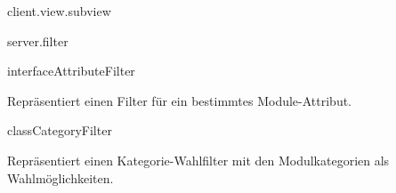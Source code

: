 \begin{texdocpackage}{client.view.subview}
\end{texdocpackage}



\begin{texdocpackage}{server.filter}
\label{texdoclet:edu.kit.informatik.studyplan.server.filter}

\begin{texdocclass}{interface}{AttributeFilter}
\label{texdoclet:edu.kit.informatik.studyplan.server.filter.AttributeFilter}
\begin{texdocclassintro}
Repräsentiert einen Filter für ein bestimmtes Module-Attribut.\end{texdocclassintro}
\begin{texdocclassmethods}
\end{texdocclassmethods}
\end{texdocclass}


\begin{texdocclass}{class}{CategoryFilter}
\label{texdoclet:edu.kit.informatik.studyplan.server.filter.CategoryFilter}
\begin{texdocclassintro}
Repräsentiert einen Kategorie-Wahlfilter mit den Modulkategorien als Wahlmöglichkeiten.\end{texdocclassintro}
\begin{texdocclassconstructors}
\end{texdocclassconstructors}
\begin{texdocclassmethods}
\end{texdocclassmethods}
\end{texdocclass}



\end{texdocpackage}
